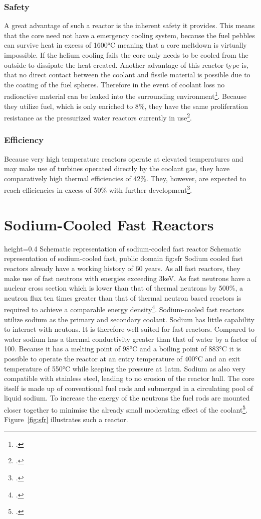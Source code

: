 \subsubsection{Safety}
A great advantage of such a reactor is the inherent safety it provides. This means that the core
need not have a emergency cooling system, because the fuel pebbles can survive heat in excess of 1600°C
meaning that a core meltdown is virtually impossible. If the helium cooling fails the core only needs to
be cooled from the outside to dissipate the heat created. Another advantage of this reactor type is, that
no direct contact between the coolant and fissile material is possible due to the coating of the fuel
spheres. Therefore in the event of coolant loss no radioactive material can be leaked
into the surrounding environment\footcite[18-21]{VHTRTS}.
Because they utilize fuel, which is only enriched to 8\%, they have the same proliferation resistance
as the pressurized water reactors currently in use\footcite{VHTRTS}.
\subsubsection{Efficiency}
Because very high temperature reactors operate at elevated temperatures and may make use of turbines
operated directly by the coolant gas, they have comparatively high thermal efficiencies of 42\%.
They, however, are expected to reach efficiencies in excess of 50\% with further development\footcite[62]{T4Gen}.
\section{Sodium-Cooled Fast Reactors}
    {height=0.4\textheight}
    {Schematic representation of sodium-cooled fast reactor}
    {Schematic representation of sodium-cooled fast, public domain}
    {fig:sfr}
Sodium cooled fast reactors already have a working history of 60 years. As all fast reactors, they make
use of fast neutrons with energies exceeding 3keV. As fast neutrons have a nuclear cross section which is lower than that
of thermal neutrons by 500\%, a neutron flux ten times greater than that of thermal neutron based reactors
is required to achieve a comparable energy density\footcite[120-122]{ReactorPhysics}.
Sodium-cooled fast reactors utilize sodium as the primary and secondary coolant. Sodium has little
capability to interact with neutons. It is therefore well suited for fast reactors. Compared
to water sodium has a thermal conductivity greater than that of water by a factor of 100. Because
it has a melting point of 98°C and a boiling point of 883°C it is possible to operate the reactor at an
entry temperature of 400°C and an exit temperature of 550°C while keeping the pressure at 1atm. Sodium
as also very compatible with stainless steel, leading to no erosion of the reactor hull. The core
itself is made up of conventional fuel rods and submerged in a circulating pool of liquid sodium.
To increase the energy of the neutrons the fuel rods are mounted closer together to minimise the
already small moderating effect of the coolant\footcite[94-110]{T4Gen}. Figure~\ref{fig:sfr} illustrates
such a reactor.
